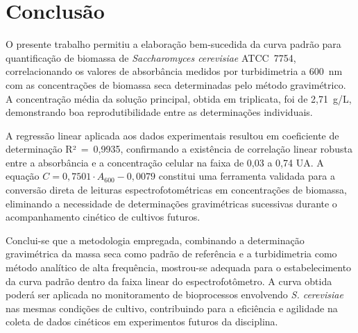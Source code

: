 
\section{Conclusão}

O presente trabalho permitiu a elaboração bem-sucedida da curva padrão para quantificação de biomassa de \textit{Saccharomyces cerevisiae} ATCC~7754, correlacionando os valores de absorbância medidos por turbidimetria a 600~nm com as concentrações de biomassa seca determinadas pelo método gravimétrico. A concentração média da solução principal, obtida em triplicata, foi de 2,71~g/L, demonstrando boa reprodutibilidade entre as determinações individuais.

A regressão linear aplicada aos dados experimentais resultou em coeficiente de determinação R²~=~0,9935, confirmando a existência de correlação linear robusta entre a absorbância e a concentração celular na faixa de 0,03 a 0,74 UA. A equação $C = 0{,}7501 \cdot A_{600} - 0{,}0079$ constitui uma ferramenta validada para a conversão direta de leituras espectrofotométricas em concentrações de biomassa, eliminando a necessidade de determinações gravimétricas sucessivas durante o acompanhamento cinético de cultivos futuros.

Conclui-se que a metodologia empregada, combinando a determinação gravimétrica da massa seca como padrão de referência e a turbidimetria como método analítico de alta frequência, mostrou-se adequada para o estabelecimento da curva padrão dentro da faixa linear do espectrofotômetro. A curva obtida poderá ser aplicada no monitoramento de bioprocessos envolvendo \textit{S. cerevisiae} nas mesmas condições de cultivo, contribuindo para a eficiência e agilidade na coleta de dados cinéticos em experimentos futuros da disciplina.

